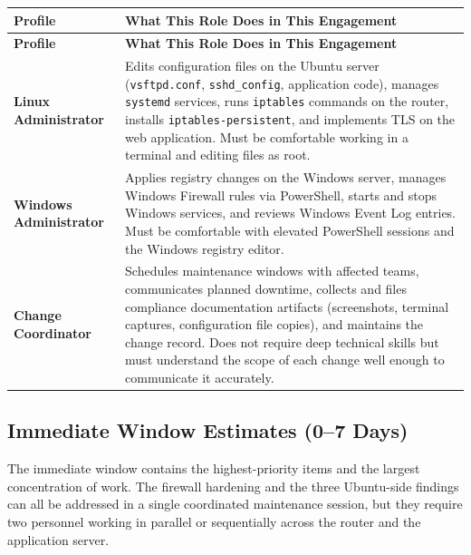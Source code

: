 \documentclass[12pt]{article}
\begin{document}
\noindent
\begin{longtable}{p{2.8cm} p{8.8cm}}
  \rowcolor{headercol}
  \color{white}\textbf{Profile} &
  \color{white}\textbf{What This Role Does in This Engagement} \\
  \endfirsthead
  \rowcolor{headercol}
  \color{white}\textbf{Profile} &
  \color{white}\textbf{What This Role Does in This Engagement} \\
  \endhead
  \midrule
 
  \textbf{Linux Administrator} &
  Edits configuration files on the Ubuntu server (\texttt{vsftpd.conf},
  \texttt{sshd\_config}, application code), manages \texttt{systemd}
  services, runs \texttt{iptables} commands on the router, installs
  \texttt{iptables-persistent}, and implements TLS on the web application.
  Must be comfortable working in a terminal and editing files as root. \\[6pt]
 
  \textbf{Windows Administrator} &
  Applies registry changes on the Windows server, manages Windows Firewall
  rules via PowerShell, starts and stops Windows services, and reviews
  Windows Event Log entries. Must be comfortable with elevated PowerShell
  sessions and the Windows registry editor. \\[6pt]
 
  \textbf{Change Coordinator} &
  Schedules maintenance windows with affected teams, communicates planned
  downtime, collects and files compliance documentation artifacts (screenshots,
  terminal captures, configuration file copies), and maintains the change
  record. Does not require deep technical skills but must understand the
  scope of each change well enough to communicate it accurately. \\[6pt]
 
  \bottomrule
\end{longtable}
 
\subsection{Immediate Window Estimates (0--7 Days)}
 
The immediate window contains the highest-priority items and the largest
concentration of work. The firewall hardening and the three Ubuntu-side
findings can all be addressed in a single coordinated maintenance session,
but they require two personnel working in parallel or sequentially across
the router and the application server.
 
\end{document}
